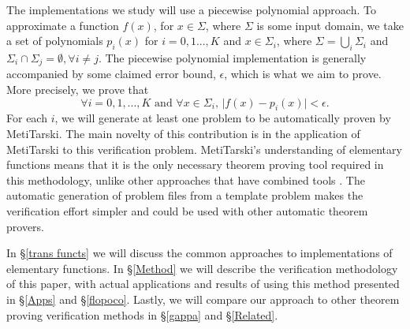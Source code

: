 \documentclass{fac}
\newcommand{\abs}[1]{\lvert#1\rvert}
\begin{document}

The implementations we study will use a piecewise polynomial approach. To approximate a function $f(x)$, for $x\in \Sigma$, where $\Sigma$ is some input domain, we take a set of polynomials $p_i(x)$ for $i=0,1...,K$ and $x \in \Sigma_i$, where $\Sigma = \bigcup_i \Sigma_i$ and $\Sigma_i \cap \Sigma_j = \emptyset, \forall i\neq j$. The piecewise polynomial implementation is generally accompanied by some claimed error bound, $\epsilon$, which is what we aim to prove. More precisely, we prove that
\begin{equation*}
    \forall i=0,1,...,K \textrm{ and } \forall x\in \Sigma_i, \, \abs{f(x)-p_i(x)}<\epsilon.
\end{equation*}
For each $i$, we will generate at least one problem to be automatically proven by MetiTarski. The main novelty of this contribution is in the application of MetiTarski to this verification problem. MetiTarski's understanding of elementary functions means that it is the only necessary theorem proving tool required in this methodology, unlike other approaches that have combined tools \cite{5483294}. The automatic generation of problem files from a template problem makes the verification effort simpler and could be used with other automatic theorem provers.

In \S \ref{trans functs} we will discuss the common approaches to implementations of elementary functions. In \S \ref{Method} we will describe the verification methodology of this paper, with actual applications and results of using this method presented in \S \ref{Apps} and \S \ref{flopoco}. Lastly, we will compare our approach to other theorem proving verification methods in \S \ref{gappa} and \S \ref{Related}.

\end{document}
